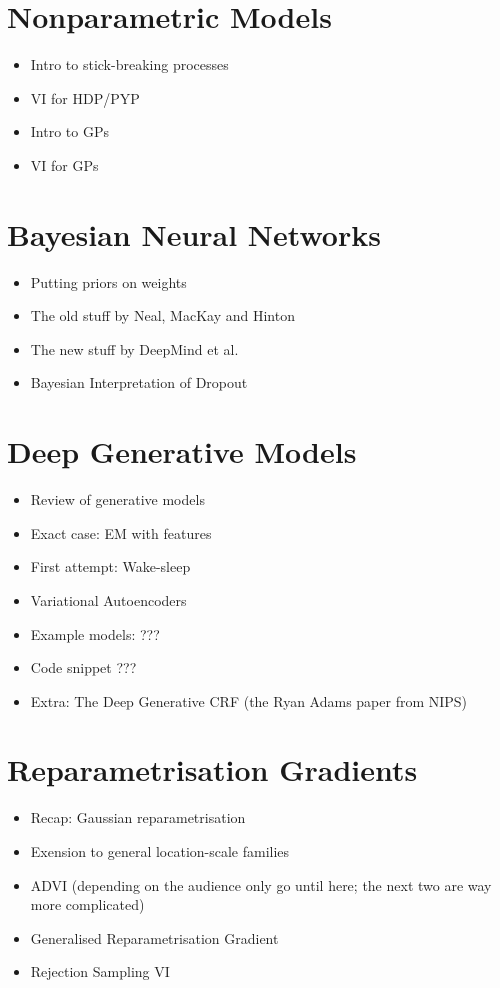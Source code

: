 \documentclass[11pt, a4paper]{article}
\begin{document}
\section{Nonparametric Models}
\begin{itemize}
\item Intro to stick-breaking processes \citep{IshwaranJames:2001}
\item VI for HDP/PYP \citep{WangEtAl:2011}
\item Intro to GPs
\item VI for GPs
\end{itemize}

\section{Bayesian Neural Networks}
\begin{itemize}
\item Putting priors on weights
\item The old stuff by Neal, MacKay and Hinton \citep{HintonVancamp:1993}
\item The new stuff by DeepMind et al. \citep{Graves:2011, BlundellEtAl:2015}
\item Bayesian Interpretation of Dropout \citep{Gal:2016}
\end{itemize}

\section{Deep Generative Models}
\begin{itemize}
\item Review of generative models
\item Exact case: EM with features
\item First attempt: Wake-sleep \citep{HintonEtAl:1995}
\item Variational Autoencoders \citep{KingmaWelling:2013, RezendeEtAl:2014}
\item Example models: ???
\item Code snippet ???
\item Extra: The Deep Generative CRF (the Ryan Adams paper from NIPS)
\end{itemize}

\section{Reparametrisation Gradients}
\begin{itemize}
\item Recap: Gaussian reparametrisation 
\item Exension to general location-scale families \citep{TitsiasLazarogredilla:2014}
\item ADVI (depending on the audience only go until here; the next two are way more complicated) \citep{KucukelbirEtAl:2017}
\item Generalised Reparametrisation Gradient \citep{RuizEtAl:2016}
\item Rejection Sampling VI \citep{NaessethEtAl:2017}
\end{itemize}
\end{document}
